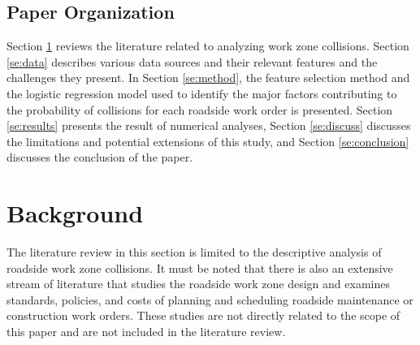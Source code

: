 \documentclass[10pt,a4paper]{article}
\begin{document}
\subsection{Paper Organization}
Section \ref{se:background} reviews the literature related to analyzing work zone collisions. Section \ref{se:data} describes various data sources and their relevant features and the challenges they present. In Section \ref{se:method}, the feature selection method and the logistic regression model used to identify the major factors contributing to the probability %
of collisions for each roadside work order is presented. Section \ref{se:results} presents the result of numerical analyses, Section \ref{se:discuss} discusses the limitations and potential extensions of this study, and Section \ref{se:conclusion} discusses the conclusion of the paper.

\section{Background} \label{se:background}
The literature review in this section is limited to the descriptive analysis of roadside work zone collisions. It must be noted that there is also an extensive stream of literature that studies the roadside work zone design and examines standards, policies, and costs of planning and scheduling roadside maintenance or construction work orders. These studies are not directly related to the scope of this paper and are not included in the literature review.

\end{document}
